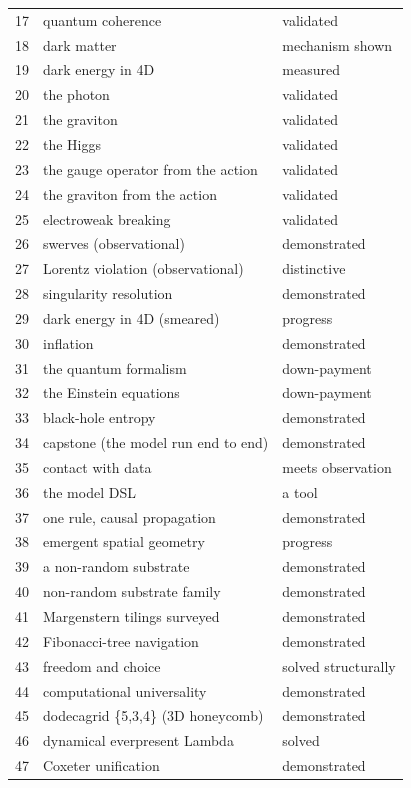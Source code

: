 \begin{center}
\begin{longtable}{r p{} l}
17 & quantum coherence & validated \\
18 & dark matter & mechanism shown \\
19 & dark energy in 4D & measured \\
20 & the photon & validated \\
21 & the graviton & validated \\
22 & the Higgs & validated \\
23 & the gauge operator from the action & validated \\
24 & the graviton from the action & validated \\
25 & electroweak breaking & validated \\
26 & swerves (observational) & demonstrated \\
27 & Lorentz violation (observational) & distinctive \\
28 & singularity resolution & demonstrated \\
29 & dark energy in 4D (smeared) & progress \\
30 & inflation & demonstrated \\
31 & the quantum formalism & down-payment \\
32 & the Einstein equations & down-payment \\
33 & black-hole entropy & demonstrated \\
34 & capstone (the model run end to end) & demonstrated \\
35 & contact with data & meets observation \\
36 & the model DSL & a tool \\
37 & one rule, causal propagation & demonstrated \\
38 & emergent spatial geometry & progress \\
39 & a non-random substrate & demonstrated \\
40 & non-random substrate family & demonstrated \\
41 & Margenstern tilings surveyed & demonstrated \\
42 & Fibonacci-tree navigation & demonstrated \\
43 & freedom and choice & solved structurally \\
44 & computational universality & demonstrated \\
45 & dodecagrid \{5,3,4\} (3D honeycomb) & demonstrated \\
46 & dynamical everpresent Lambda & solved \\
47 & Coxeter unification & demonstrated \\

\end{longtable}
\end{center}
